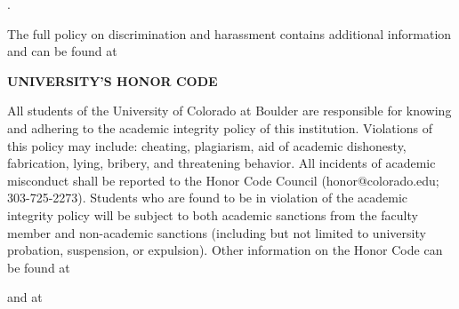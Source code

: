 \documentclass[11pt]{article}
\begin{document}
. 

The full policy on discrimination and harassment contains additional information and can be found at 



\bigskip
\textbf{\normalsize UNIVERSITY'S HONOR CODE}

All students of the University of Colorado at Boulder are
responsible for knowing and adhering to the academic integrity
policy of this institution. Violations of this policy may include:
cheating, plagiarism, aid of academic dishonesty, fabrication,
lying, bribery, and threatening behavior. All incidents of academic
misconduct shall be reported to the Honor Code Council
(honor@colorado.edu; 303-725-2273). Students who are found to be in
violation of the academic integrity policy will be subject to both
academic sanctions from the faculty member and non-academic
sanctions (including but not limited to university probation,
suspension, or expulsion). Other information on the Honor Code can
be found at 


and at


\newcommand{\lect}[2]
{\parbox[t]{2.0in}{\textbf{#1:} \\ \hspace*{0.25in} \parbox[t]{2.5in}{\footnotesize{ #2}} \\ }}

\newpage
\normalsize
\end{document}
